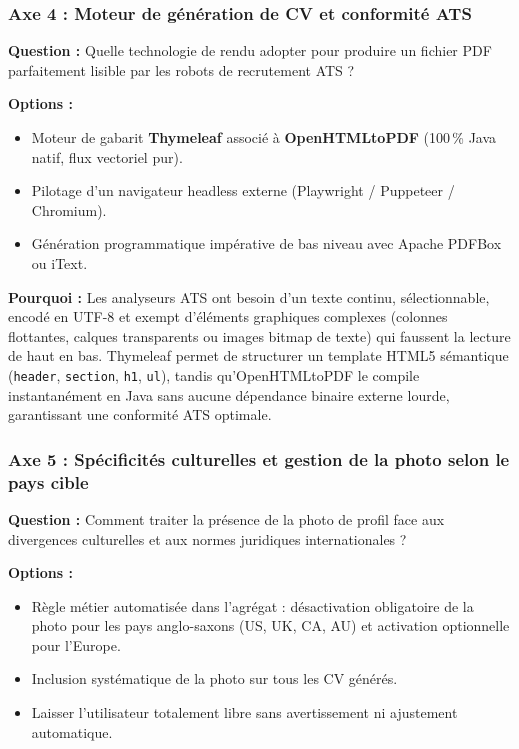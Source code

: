 \documentclass[11pt,a4paper]{article}
\begin{document}
\newpage

\subsubsection{Axe 4 : Moteur de génération de CV et conformité ATS}
\textbf{Question :} Quelle technologie de rendu adopter pour produire un fichier PDF parfaitement lisible par les robots de recrutement ATS ?

\textbf{Options :}
\begin{itemize}
    \item[$\boxtimes$] Moteur de gabarit \textbf{Thymeleaf} associé à \textbf{OpenHTMLtoPDF} (100\,\% Java natif, flux vectoriel pur).
    \item[$\square$] Pilotage d'un navigateur headless externe (Playwright / Puppeteer / Chromium).
    \item[$\square$] Génération programmatique impérative de bas niveau avec Apache PDFBox ou iText.
\end{itemize}

\textbf{Pourquoi :} Les analyseurs ATS ont besoin d'un texte continu, sélectionnable, encodé en UTF-8 et exempt d'éléments graphiques complexes (colonnes flottantes, calques transparents ou images bitmap de texte) qui faussent la lecture de haut en bas. Thymeleaf permet de structurer un template HTML5 sémantique (\texttt{header}, \texttt{section}, \texttt{h1}, \texttt{ul}), tandis qu'OpenHTMLtoPDF le compile instantanément en Java sans aucune dépendance binaire externe lourde, garantissant une conformité ATS optimale.

\subsubsection{Axe 5 : Spécificités culturelles et gestion de la photo selon le pays cible}
\textbf{Question :} Comment traiter la présence de la photo de profil face aux divergences culturelles et aux normes juridiques internationales ?

\textbf{Options :}
\begin{itemize}
    \item[$\boxtimes$] Règle métier automatisée dans l'agrégat : désactivation obligatoire de la photo pour les pays anglo-saxons (US, UK, CA, AU) et activation optionnelle pour l'Europe.
    \item[$\square$] Inclusion systématique de la photo sur tous les CV générés.
    \item[$\square$] Laisser l'utilisateur totalement libre sans avertissement ni ajustement automatique.
\end{itemize}
\end{document}
